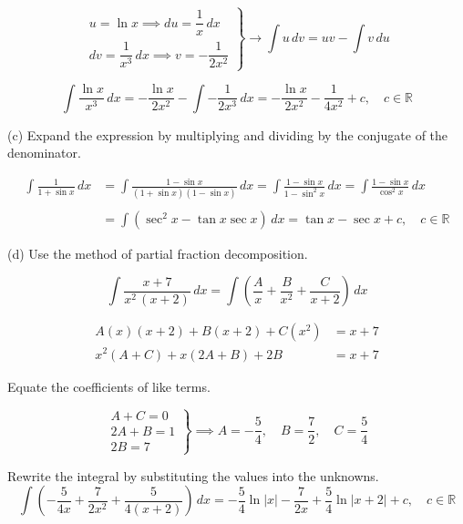 \documentclass{article}
\begin{document}
\[\left.\begin{array}{c}
u=\ln x\implies du=\dfrac1x\,dx\\[1em]
dv=\dfrac1{x^3}\,dx\implies v=-\dfrac1{2x^2}
\end{array}\right\}\rightarrow \int u\,dv=uv-\int v\,du\]

\[\int\frac{\ln x}{x^3}\,dx=-\frac{\ln x}{2x^2}-\int-\frac1{2x^3}\,dx=\boxed{-\frac{\ln x}{2x^2}-\frac1{4x^2}+c,\quad c\in\mathbb{R}}\]

\hfill

\noindent (c) Expand the expression by multiplying and dividing by the conjugate of the denominator.

\begin{align*}\int\frac1{1+\sin x}\,dx&=\int\frac{1-\sin x}{(1+\sin x)(1-\sin x)}\,dx=\int\frac{1-\sin x}{1-\sin^2x}\,dx=\int\frac{1-\sin x}{\cos^2x}\,dx\\\\&=\int\left(\sec^2x-\tan x\sec x\right)\,dx=\boxed{\tan x-\sec x+c,\quad c\in\mathbb{R}}\end{align*}

\hfill

\noindent (d) Use the method of partial fraction decomposition.

\[\int\frac{x+7}{x^2\,(x+2)}\,dx=\int\left(\frac{A}{x}+\frac{B}{x^2}+\frac{C}{x+2}\right)\,dx\]

\[\begin{array}{rc}
A(x)(x+2)+B(x+2)+C\left(x^2\right)&=x+7\\
x^2(A+C)+x(2A+B)+2B&=x+7
\end{array}\]

\hfill

\noindent Equate the coefficients of like terms.

\[\left.\begin{array}{c}
A+C=0\\
2A+B=1\\
2B=7
\end{array}\right\}\implies A=-\dfrac54, \quad B=\dfrac72,\quad C=\dfrac54\]

\hfill

\noindent Rewrite the integral by substituting the values into the unknowns.
\[\int\left(-\frac5{4x}+\frac{7}{2x^2}+\frac5{4(x+2)}\right)\,dx=\boxed{-\frac{5}4\ln\left|x\right|-\frac7{2x}+\frac54\ln\left|x+2\right|+c,\quad c\in\mathbb{R}}\]

\hfill
\end{document}
